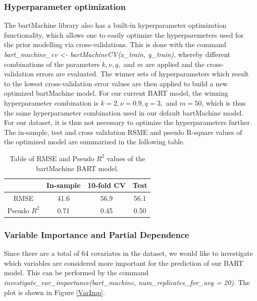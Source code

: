 \documentclass{usiinftr}
\begin{document}
\subsubsection{Hyperparameter optimization}
The bartMachine library also has a built-in hyperparameter optimization functionality, which allows one to easily optimize the hyperparemeters used for the prior modelling via cross-validations. This is done with the command \textit{bart\_machine\_cv <- bartMachineCV(x\_train, y\_train)}, whereby different combinations of the parameters $k, \nu, q,$ and $m$ are applied and the cross-validation errors are evaluated. The winner sets of hyperparameters which result to the lowest cross-validation error values are then applied to build a new optimized bartMachine model. For our current BART model, the winning hyperparameter combination is  $k = 2, \nu = 0.9, q = 3,$ and $m = 50$, which is thus the same hyperparameter combination used in our default bartMachine model. For our dataset, it is thus not necessary to optimize the hyperparameters further. The in-sample, test and cross validation RSME and pseudo R-square values of the optimized model are summarized in the following table.

\begin{table}[h!]
\centering
\caption{Table of RMSE and Pseudo $R^2$ values of the bartMachine BART model.}
\begin{tabular}{|c|c|c|c|}
\hline & In-sample & 10-fold CV & Test \\
\hline RMSE & 41.6 & 56.9 & 56.1 \\
\hline Pseudo $R^2$ & 0.71 & 0.45 & 0.50 \\ \hline
\end{tabular}
\label{RMSEBART}
\end{table}

\subsubsection{Variable Importance and Partial Dependence}
Since there are a total of 64 covariates in the dataset, we would like to investigate which variables are considered more important for the prediction of our BART model. This can be performed by the command \textit{investigate\_var\_importance(bart\_machine, num\_replicates\_for\_avg = 20)}. The plot is shown in Figure \ref{VarImp}.
\end{document}
